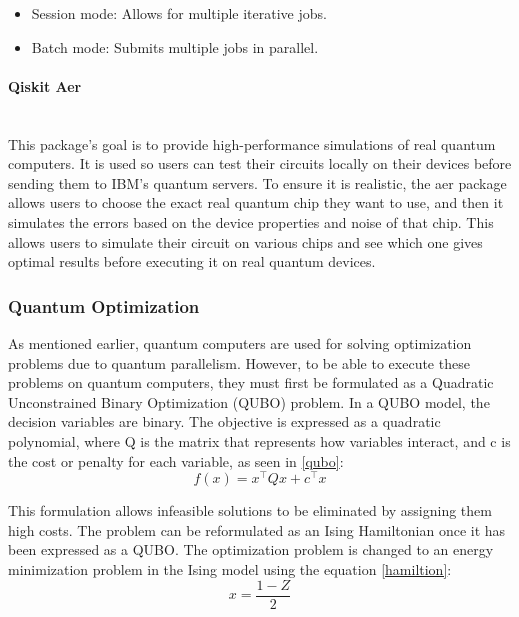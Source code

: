 \documentclass[a4paper]{report}
\begin{document}
{\begin{itemize}
\begin{itemize}
\end{itemize}
\begin{itemize}
    \item Session mode: Allows for multiple iterative jobs.

\end{itemize}

\begin{itemize}
    \item Batch mode: Submits multiple jobs in parallel.

\end{itemize}
\paragraph{Qiskit Aer}
\mbox{} \\
This package's goal is to provide high-performance simulations of real quantum computers. It is used so users can test their circuits locally on their devices before sending them to IBM’s quantum servers. To ensure it is realistic, the aer package allows users to choose the exact real quantum chip they want to use, and then it simulates the errors based on the device properties and noise of that chip. This allows users to simulate their circuit on various chips and see which one gives optimal results before executing it on real quantum devices.

\subsubsection{{Quantum Optimization}}
As mentioned earlier, quantum computers are used for solving optimization problems due to quantum parallelism. However, to be able to execute these problems on quantum computers, they must first be formulated as a Quadratic Unconstrained Binary Optimization (QUBO) problem. In a QUBO model, the decision variables are binary.  The objective is expressed as a quadratic polynomial, where Q is the matrix that represents how variables interact, and c is the cost or penalty for each variable, as seen in \ref{qubo}:
\begin{equation}
    f(x) = x^\top Q x + c^\top x
    \label{qubo}
\end{equation}

This formulation allows infeasible solutions to be eliminated by assigning them high costs.
The problem can be reformulated as an Ising Hamiltonian once it has been expressed as a QUBO. The optimization problem is changed to an energy minimization problem in the Ising model using the  equation \ref{hamiltion}:
\begin{equation}
    x = \frac{1 - Z}{2}
\label{hamiltion}
\end{equation}



\end{itemize}}
\end{document}
